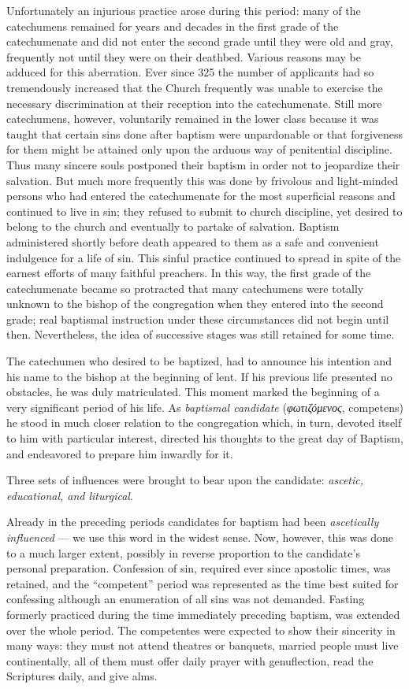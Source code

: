 Unfortunately an injurious practice arose during this period: many of the catechumens remained for years and decades in the first grade of the catechumenate and did not enter the second grade until they were old and gray, frequently not until they were on their deathbed. Various reasons may be adduced for this aberration. Ever since 325 the number of applicants had so tremendously increased that the Church frequently was unable to exercise the necessary discrimination at their reception into the catechumenate. Still more catechumens, however, voluntarily remained in the lower class because it was taught that certain sins done after baptism were unpardonable or that forgiveness for them might be attained only upon the arduous way of penitential discipline. Thus many sincere souls postponed their baptism in order not to jeopardize their salvation. But much more frequently this was done by frivolous and light-minded persons who had entered the catechumenate for the most superficial reasons and continued to live in sin; they refused to submit to church discipline, yet desired to belong to the church and eventually
to partake of salvation. Baptism administered shortly before death appeared to them as a safe and convenient indulgence for a life of sin. This sinful practice continued to spread in spite of the earnest efforts of many faithful preachers. In this way, the first grade of the catechumenate became so protracted that many catechumens were totally unknown to the bishop of the congregation when they entered into the second grade; real baptismal instruction under these circumstances did not begin until then. Nevertheless, the idea of successive stages was still retained for some time.

The catechumen who desired to be baptized, had to announce his intention and his name to the bishop at the beginning of lent. If his previous life presented no obstacles, he was duly matriculated. This moment marked the beginning of a very significant period of his life. As \emph{baptismal candidate} (\emph{φωτιζόμενος}, competens) he stood in much closer relation to the congregation which, in turn, devoted itself to him with particular interest, directed his thoughts to the great day of Baptism, and endeavored to prepare him inwardly for it.

Three sets of influences were brought to bear upon the candidate: \emph{ascetic, educational, and liturgical}.

Already in the preceding periods candidates for baptism had been \emph{ascetically influenced} — we use this word in the widest sense. Now, however, this was done to a much larger extent, possibly in reverse proportion to the candidate’s personal preparation. Confession of sin, required ever since apostolic times, was retained, and the “competent” period was represented as the time best suited for confessing although an enumeration of all sins was not demanded. Fasting formerly practiced during the time immediately preceding baptism, was extended over the whole period. The competentes were expected to show their sincerity in many ways: they must not attend theatres or banquets, married people must live
continentally, all of them must offer daily prayer with genuflection, read the Scriptures daily, and give alms.

